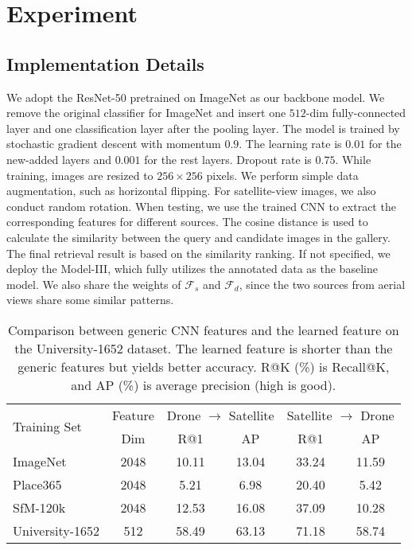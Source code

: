 \documentclass[sigconf]{acmart}
\begin{document}
\section{Experiment}
\subsection{Implementation Details}
We adopt the ResNet-50 \cite{he2016deep} pretrained on ImageNet \cite{deng2009imagenet} as our backbone model. We remove the original classifier for ImageNet and insert one $512$-dim fully-connected layer and one classification layer after the pooling layer. The model is trained by stochastic gradient descent with momentum $0.9$. The learning rate is $0.01$ for the new-added layers and $0.001$ for the rest layers. Dropout rate is $0.75$. While training, images are resized to $256 \times 256$ pixels. We perform simple data augmentation, such as horizontal flipping. For satellite-view images, we also conduct random rotation. When testing, we use the trained CNN to extract the corresponding features for different sources. The cosine distance is used to calculate the similarity between the query and candidate images in the gallery. The final retrieval result is based on the similarity ranking. 
If not specified, we deploy the Model-III, which fully utilizes the annotated data as the baseline model. We also share the weights of $\mathcal{F}_s$ and $\mathcal{F}_d$, since the two sources from aerial views share some similar patterns.

\setlength{\tabcolsep}{5pt}
\begin{table}
\small
\begin{center}
\begin{tabular}{l|c|cc|cc}
\hline
\multirow{2}{*}{Training Set} & Feature & \multicolumn{2}{c|}{Drone $\rightarrow$ Satellite} & \multicolumn{2}{c}{Satellite $\rightarrow$ Drone}\\
  & Dim & R@1 & AP & R@1 & AP\\
\shline
ImageNet \cite{deng2009imagenet} & 2048 & 10.11 & 13.04 & 33.24 & 11.59 \\
Place365 \cite{zhou2017places} & 2048 & 5.21 & 6.98 & 20.40 & 5.42 \\
SfM-120k \cite{radenovic2018fine} & 2048 & 12.53 & 16.08 & 37.09 & 10.28 \\
University-1652 & 512 & 58.49 & 63.13 & 71.18 & 58.74 \\
\hline
\end{tabular}
\end{center}
\caption{ Comparison between generic CNN features and the learned feature on the University-1652 dataset. The learned feature is shorter than the generic features but yields better accuracy. R@K (\%) is Recall@K, and AP (\%) is average precision (high is good).}
\label{table:Generic}
\end{table}
\end{document}
